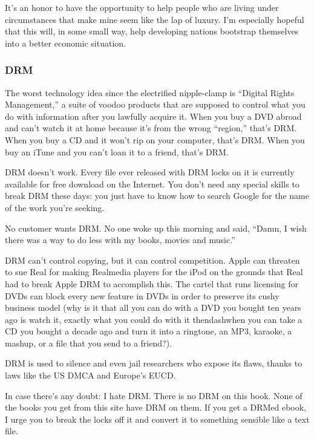 It's an honor to have the opportunity to help people who are living
under circumstances that make mine seem like the lap of luxury.  I'm
especially hopeful that this will, in some small way, help developing
nations bootstrap themselves into a better economic situation.


\subsubsection{DRM}

The worst technology idea since the electrified nipple-clamp is
``Digital Rights Management,'' a suite of voodoo products that are
supposed to control what you do with information after you lawfully
acquire it.  When you buy a DVD abroad and can't watch it at home
because it's from the wrong ``region,'' that's DRM.  When you buy a CD
and it won't rip on your computer, that's DRM.  When you buy an iTune
and you can't loan it to a friend, that's DRM.

DRM doesn't work.  Every file ever released with DRM locks on it is
currently available for free download on the Internet.  You don't need
any special skills to break DRM these days:  you just have to know how
to search Google for the name of the work you're seeking.

No customer wants DRM.  No one woke up this morning and said, ``Damn,
I wish there was a way to do less with my books, movies and music.''

DRM can't control copying, but it can control competition.  Apple can
threaten to sue Real for making Realmedia players for the iPod on the
grounds that Real had to break Apple DRM to accomplish this.  The
cartel that runs licensing for DVDs can block every new feature in
DVDs in order to preserve its cushy business model (why is it that all
you can do with a DVD you bought ten years ago is watch it, exactly
what you could do with it thendash{}when you can take a CD you bought a
decade ago and turn it into a ringtone, an MP3, karaoke, a mashup, or
a file that you send to a friend?).

DRM is used to silence and even jail researchers who expose its flaws,
thanks to laws like the US DMCA and Europe's EUCD. 

In case there's any doubt:  I hate DRM.  There is no DRM on this book. 
None of the books you get from this site have DRM on them.  If you get
a DRMed ebook, I urge you to break the locks off it and convert it to
something sensible like a text file. 

